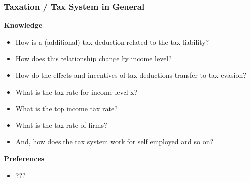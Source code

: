 \documentclass[a4paper, 12pt]{article}
\begin{document}
\subsubsection{Taxation / Tax System in General}
\textbf{Knowledge}
\begin{itemize}
    \item How is a (additional) tax deduction related to the tax liability? 
    \item How does this relationship change by income level?
    \item How do the effects and incentives of tax deductions transfer to tax evasion?
    \item What is the tax rate for income level x? 
    \item What is the top income tax rate? 
    \item What is the tax rate of firms?
    \item And, how does the tax system work for self employed and so on?
\end{itemize}
\textbf{Preferences}
\begin{itemize}
    \item ???
\end{itemize}
\end{document}
